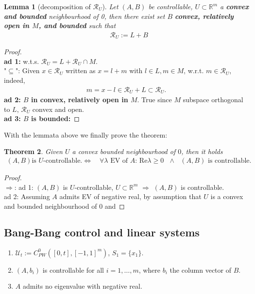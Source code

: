 \documentclass[a4paper,11pt,fleqn]{book}
\newtheorem{theorem}{Theorem}[section]
\newtheorem{lemma}[theorem]{Lemma}
\theoremstyle{definition}
\theoremstyle{remark}
\begin{document}
\begin{lemma}[decomposition of $\mathcal{R}_U$]
Let $(A, B)$ be controllable, $U \subset \mathbb{R}^m$ a \textbf{convex and bounded} neighbourhood of 0, then there exist set $B$ \textbf{convex, relatively open in $M$,  and bounded} such that
	\begin{align*}
		& \mathcal{R}_U:= L + B 
	\end{align*}
\end{lemma}
\begin{proof}
\quad\\
\textbf{ad 1: } w.t.s. $\mathcal{R}_U = L + \mathcal{R}_U \cap M$. \\
"$\subseteq$": Given $x \in \mathcal{R}_U$ written as $x = l + m$ with $l \in L, m \in M$, w.r.t. $m \in \mathcal{R}_U$, indeed, 
\begin{align*}
	m = x - l \in \mathcal{R}_U + L \subset \mathcal{R}_U.
\end{align*}
\textbf{ad 2: $B$ in convex, relatively open in $M$}. True since $M$ subspace orthogonal to $L$, $\mathcal{R}_U$ convex and open. \\
\textbf{ad 3: $B$ is bounded:}   
\end{proof}

With the lemmata above we finally prove the theorem: 
\begin{theorem}
	Given $U$ a convex bounded neighbourhood of $0$, then it holds
	\begin{align*}
		(A, B) \text{is $U$-controllable.} \Leftrightarrow  \quad \forall \lambda \text{ EV of $A$: } \text{Re} \lambda \ge 0  \text{ $\wedge$ }(A, B) \text{ is controllable. }
	\end{align*}
\end{theorem} 
\begin{proof}
	\quad\\
	$\Rightarrow$: ad 1: $(A, B)$ is $U$-controllable, $U \subset \mathbb{R}^m$ $\Rightarrow$ $(A, B)$ is controllable. \\
	ad 2: Assuming $A$ admits EV of negative real, by assumption that $U$ is a convex and bounded neighbourhood of $0$ and 
\end{proof}



\subsection{Bang-Bang control and linear systems}
\begin{enumerate}
	\item $\mathcal{U}_t:= C^0_{PW}([0, t], [-1, 1]^m)$, $S_1 = \{x_1\}.$ 
	\item $(A, b_i)$ is controllable for all $i = 1, \dots, m$, where $b_i$ the column vector of $B$. 
	\item $A$ admits no eigenvalue with negative real. 
\end{enumerate}
\end{document}
